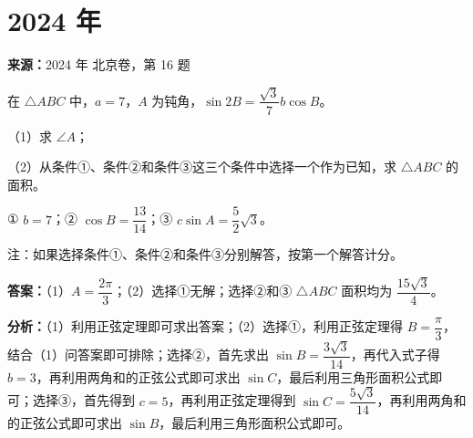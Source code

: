 \section*{2024 年}

\begin{question}[points=13]
\textbf{来源：}2024 年 北京卷，第 16 题\par
在 $\triangle ABC$ 中，$a=7$，$A$ 为钝角，$\sin 2B = \dfrac{\sqrt{3}}{7} b \cos B$。

（1）求 $\angle A$；

（2）从条件①、条件②和条件③这三个条件中选择一个作为已知，求 $\triangle ABC$ 的面积。

① $b=7$；② $\cos B = \dfrac{13}{14}$；③ $c\sin A = \dfrac{5}{2}\sqrt{3}$。

注：如果选择条件①、条件②和条件③分别解答，按第一个解答计分。
\begin{solution}
\textbf{答案：}（1）$A=\dfrac{2\pi}{3}$；（2）选择①无解；选择②和③ $\triangle ABC$ 面积均为 $\dfrac{15\sqrt{3}}{4}$。

\textbf{分析：}（1）利用正弦定理即可求出答案；（2）选择①，利用正弦定理得 $B=\dfrac{\pi}{3}$，结合（1）问答案即可排除；选择②，首先求出 $\sin B = \dfrac{3\sqrt{3}}{14}$，再代入式子得 $b=3$，再利用两角和的正弦公式即可求出 $\sin C$，最后利用三角形面积公式即可；选择③，首先得到 $c=5$，再利用正弦定理得到 $\sin C = \dfrac{5\sqrt{3}}{14}$，再利用两角和的正弦公式即可求出 $\sin B$，最后利用三角形面积公式即可。


\end{solution}
\end{question}
